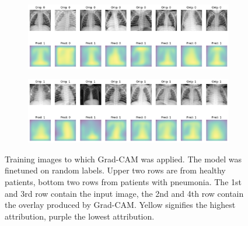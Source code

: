 \begin{figure}
    \centering
    \begin{subfigure}{\textwidth}
        \includegraphics[width=1\textwidth]{images/gc_rand_train.png}
    \end{subfigure}
    \centering
    \begin{subfigure}{\textwidth}
        \includegraphics[width=1\textwidth]{images/gc_rand_train_P.png}
    \end{subfigure}
    \caption{Training images to which Grad-CAM was applied. The model was finetuned on random labels. Upper two rows are from healthy patients, bottom two rows from patients with pneumonia. The 1st and 3rd row contain the input image, the 2nd and 4th row contain the overlay produced by Grad-CAM. Yellow signifies the highest attribution, purple the lowest attribution.}
    \label{fig:gc_rand_train}
\end{figure}

